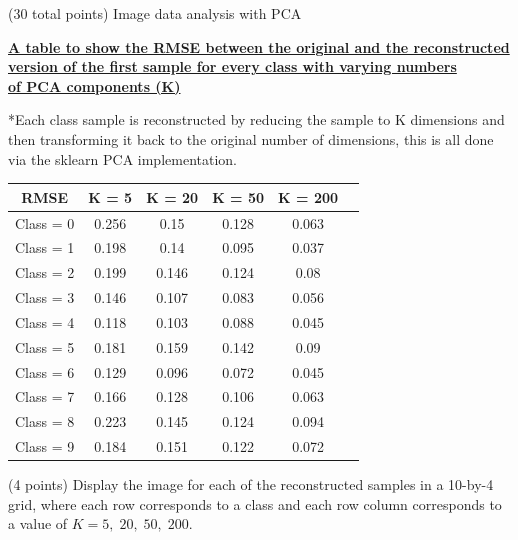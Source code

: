 \documentclass[12pt]{article}
\begin{document}
\begin{question}{(30 total points) Image data analysis with PCA}
\begin{subquestion}
      \begin{answerbox}{23em}
        \begin{center}
        \textbf{\underline{A table to show the RMSE between the original and the reconstructed}}\\
        \textbf{\underline{version of the first sample for every class with varying numbers}}\\
        \textbf{\underline{of PCA components (K)}} \\
        \vspace{0.3cm}
        \footnotesize{*Each class sample is reconstructed by reducing the sample to K dimensions and then transforming it back to the original number of dimensions, this is all done via the sklearn PCA implementation.\\
        \vspace{0.5cm}
        \begin{tabular}{ |c|c|c|c|c|c| } \hline
            \textbf{RMSE} & K = 5 & K = 20 & K = 50 & K = 200 \\ \hline
            Class = 0 & 0.256 & 0.15 & 0.128 & 0.063 \\
            Class = 1 & 0.198 & 0.14 & 0.095 & 0.037 \\
            Class = 2 & 0.199 & 0.146 & 0.124 & 0.08 \\
            Class = 3 & 0.146 & 0.107 & 0.083 & 0.056 \\
            Class = 4 & 0.118 & 0.103 & 0.088 & 0.045 \\
            Class = 5 & 0.181 & 0.159 & 0.142 & 0.09 \\
            Class = 6 & 0.129 & 0.096 & 0.072 & 0.045 \\
            Class = 7 & 0.166 & 0.128 & 0.106 & 0.063 \\
            Class = 8 & 0.223 & 0.145 & 0.124 & 0.094 \\
            Class = 9 & 0.184 & 0.151 & 0.122 & 0.072 \\
            \hline
        \end{tabular}
        }
        \end{center}
      \end{answerbox}
  


   \end{subquestion}
   
   \begin{subquestion}{(4 points)
       Display the image for each of the reconstructed samples in
       a 10-by-4 grid, where each row corresponds to a class and
       each row column corresponds to a value of $K=5, \; 20, \; 50, \; 200$.
     } \label{Q1.7}



\end{subquestion}
\end{question}
\end{document}
